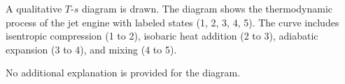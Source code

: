 A qualitative \( T \)-\( s \) diagram is drawn. The diagram shows the thermodynamic process of the jet engine with labeled states (1, 2, 3, 4, 5). The curve includes isentropic compression (1 to 2), isobaric heat addition (2 to 3), adiabatic expansion (3 to 4), and mixing (4 to 5).  

No additional explanation is provided for the diagram.